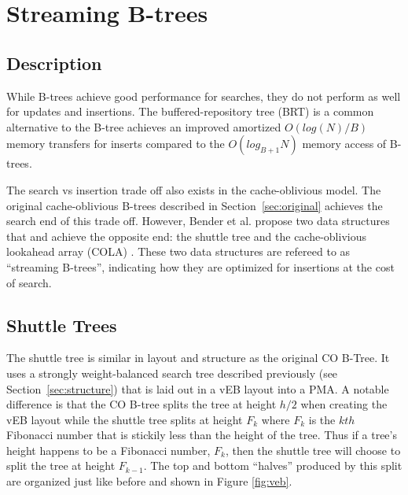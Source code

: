 \documentclass{style}
\begin{document}
\section{Streaming B-trees}

\subsection{Description}

While B-trees achieve good performance for searches, they do not perform as
well for updates and insertions. The buffered-repository tree (BRT) is a
common alternative to the B-tree achieves an improved amortized $O(log(N)/B)$
memory transfers for inserts compared to the $O(log_{B+1}N)$ memory access of
B-trees.

The search vs insertion trade off also exists in the cache-oblivious model.
The original cache-oblivious B-trees described in Section~\ref{sec:original}
achieves the search end of this trade off. However, Bender et al. propose two
data structures that and achieve the opposite end: the shuttle tree and the
cache-oblivious lookahead array (COLA) \cite{BenderFaFi07}. These two data
structures are refereed to as ``streaming B-trees'', indicating how they are
optimized for insertions at the cost of search.

\subsection{Shuttle Trees}

The shuttle tree is similar in layout and structure as the original CO B-Tree.
It uses a strongly weight-balanced search tree described previously (see
Section~\ref{sec:structure}) that is laid out in a vEB layout into a PMA. A
notable difference is that the CO B-tree splits the tree at height $h/2$ when
creating the vEB layout while the shuttle tree splits at height $F_k$ where
$F_k$ is the $kth$ Fibonacci number that is stickily less than the height of
the tree. Thus if a tree's height happens to be a Fibonacci number, $F_k$,
then the shuttle tree will choose to split the tree at height $F_{k-1}$. The
top and bottom ``halves'' produced by this split are organized just like
before and shown in Figure \ref{fig:veb}.
\end{document}
